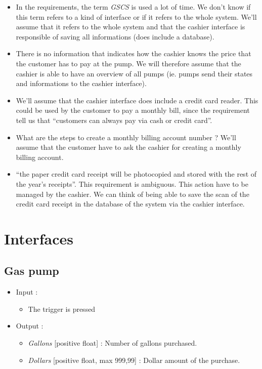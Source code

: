 \documentclass[11pt, a4paper]{article}
\newcommand{\data}[1]{\textit{#1}}
\begin{document}
\begin{itemize}

\item In the requirements, the term \textit{GSCS} is used a lot of time. We don't know if this term refers to a kind of interface or if it refers to the whole system. We'll assume that it refers to the whole system and that the cashier interface is responsible of saving all informations (does include a database).

\item There is no information that indicates how the cashier knows the price that the customer has to pay at the pump. We will therefore assume that the cashier is able to have an overview of all pumps (ie. pumps send their states and informations to the cashier interface).

\item We'll assume that the cashier interface does include a credit card reader. This could be used by the customer to pay a monthly bill, since the requirement tell us that \enquote{customers can always pay via cash or credit card}.

\item What are the steps to create a monthly billing account number ? We'll assume that the customer have to ask the cashier for creating a monthly billing account.

\item \enquote{the paper credit card receipt will be photocopied and stored with the rest of the year’s receipts}. This requirement is ambiguous. This action have to be managed by the cashier. We can think of being able to save the scan of the credit card receipt in the database of the system via the cashier interface.

\end{itemize}


\section{Interfaces}

\subsection{Gas pump}

\begin{itemize}
\item Input :
		\begin{itemize}
		\item The trigger is pressed
		\end{itemize}

\item Output :
		\begin{itemize}
		\item \data{Gallons} [positive float] : Number of gallons purchased. 
    \item \data{Dollars} [positive float, max 999,99] : Dollar amount of the purchase.
		\end{itemize}
\end{itemize}
\end{document}
